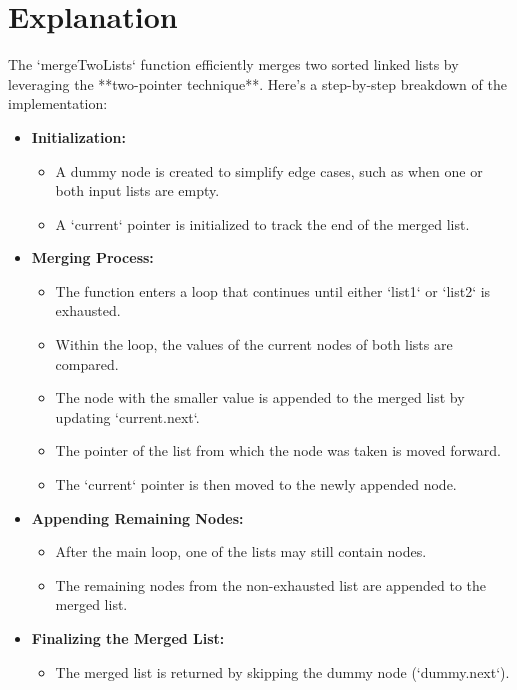 \section*{Explanation}
The `mergeTwoLists` function efficiently merges two sorted linked lists by leveraging the **two-pointer technique**. Here's a step-by-step breakdown of the implementation:

\begin{itemize}
    \item \textbf{Initialization:}
    \begin{itemize}
        \item A dummy node is created to simplify edge cases, such as when one or both input lists are empty.
        \item A `current` pointer is initialized to track the end of the merged list.
    \end{itemize}
    
    \item \textbf{Merging Process:}
    \begin{itemize}
        \item The function enters a loop that continues until either `list1` or `list2` is exhausted.
        \item Within the loop, the values of the current nodes of both lists are compared.
        \item The node with the smaller value is appended to the merged list by updating `current.next`.
        \item The pointer of the list from which the node was taken is moved forward.
        \item The `current` pointer is then moved to the newly appended node.
    \end{itemize}
    
    \item \textbf{Appending Remaining Nodes:}
    \begin{itemize}
        \item After the main loop, one of the lists may still contain nodes.
        \item The remaining nodes from the non-exhausted list are appended to the merged list.
    \end{itemize}
    
    \item \textbf{Finalizing the Merged List:}
    \begin{itemize}
        \item The merged list is returned by skipping the dummy node (`dummy.next`).
    \end{itemize}
\end{itemize}


